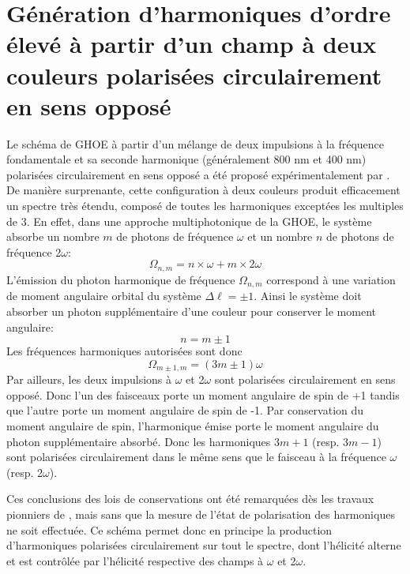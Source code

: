 \section[GHOE à partir d'un champ à deux couleurs polarisées circulairement en sens opposé]{Génération d'harmoniques d'ordre élevé à partir d'un champ à deux couleurs polarisées circulairement en sens opposé}
\label{sec:Intro2couleurs}
Le schéma de GHOE à partir d'un mélange de deux impulsions à la fréquence fondamentale et sa seconde harmonique (généralement 800 nm et 400 nm) polarisées circulairement en sens opposé a été proposé expérimentalement par . De manière surprenante, cette configuration à deux couleurs produit efficacement un spectre très étendu, composé de toutes les harmoniques exceptées les multiples de 3. En effet, dans une approche multiphotonique de la GHOE, le système absorbe un nombre $m$ de photons de fréquence $\omega$ et un nombre $n$ de photons de fréquence 2$\omega$: 
\begin{equation}
\Omega_{n,m} = n \times \omega + m \times 2 \omega
\end{equation}
L'émission du photon harmonique de fréquence $\Omega_{n,m}$ correspond à une variation de moment angulaire orbital du système $\Delta \ell = \pm 1$. Ainsi le système doit absorber un photon supplémentaire d'une couleur pour conserver le moment angulaire:
\begin{equation}
n = m \pm 1
\end{equation}
Les fréquences harmoniques autorisées sont donc
\begin{equation}
\Omega_{m \pm 1,m} = (3m \pm 1) \omega
\end{equation}
Par ailleurs, les deux impulsions à $\omega$ et 2$\omega$ sont polarisées circulairement en sens opposé. Donc l'un des faisceaux porte un moment angulaire de spin de +1 tandis que l'autre porte un moment angulaire de spin de -1. Par conservation du moment angulaire de spin, l'harmonique émise porte le moment angulaire du photon supplémentaire absorbé. Donc les harmoniques $3m+1$ (resp. $3m-1$) sont polarisées circulairement dans le même sens que le faisceau à la fréquence $\omega$ (resp. 2$\omega$).

Ces conclusions des lois de conservations ont été remarquées dès les travaux pionniers de , mais sans que la mesure de l'état de polarisation des harmoniques ne soit effectuée. Ce schéma permet donc en principe la production d'harmoniques polarisées circulairement sur tout le spectre, dont l'hélicité alterne et est contrôlée par l'hélicité respective des champs à $\omega$ et 2$\omega$.

